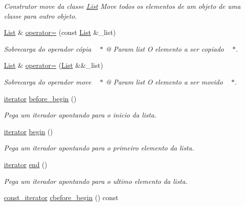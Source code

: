 \begin{DoxyCompactItemize}
\begin{DoxyCompactList}\small\item\em Construtor move da classe \hyperlink{class_list}{List} Move todos os elementos de um objeto de uma classe para outro objeto. \end{DoxyCompactList}\item 
\hyperlink{class_list}{List} \& \hyperlink{class_list_a3a2c792d937e5df5ff9977853021feee}{operator=} (const \hyperlink{class_list}{List} \&\+\_\+list)
\begin{DoxyCompactList}\small\item\em Sobrecarga do operador cópia   $\ast$ @ Param list O elemento a ser copiado   $\ast$. \end{DoxyCompactList}\item 
\hyperlink{class_list}{List} \& \hyperlink{class_list_ad9b33c07a074c6cf4551f097d11f2739}{operator=} (\hyperlink{class_list}{List} \&\&\+\_\+list)
\begin{DoxyCompactList}\small\item\em Sobrecarga do operador move   $\ast$ @ Param list O elemento a ser movido   $\ast$. \end{DoxyCompactList}\item 
\hyperlink{class_list_1_1iterator}{iterator} \hyperlink{class_list_af5325bc089d1216204eba3d7febe68fd}{before\+\_\+begin} ()
\begin{DoxyCompactList}\small\item\em Pega um iterador apontando para o inicio da lista. \end{DoxyCompactList}\item 
\hyperlink{class_list_1_1iterator}{iterator} \hyperlink{class_list_a0826516313ad1e1bd48bfbb96bee618b}{begin} ()
\begin{DoxyCompactList}\small\item\em Pega um iterador apontando para o primeiro elemento da lista. \end{DoxyCompactList}\item 
\hyperlink{class_list_1_1iterator}{iterator} \hyperlink{class_list_ab18d47922493e508f89a0cf8c82fc4a0}{end} ()
\begin{DoxyCompactList}\small\item\em Pega um iterador apontando para o ultimo elemento da lista. \end{DoxyCompactList}\item 
\hyperlink{class_list_1_1const__iterator}{const\+\_\+iterator} \hyperlink{class_list_a4d03e75dc105d2c9ed6a1aa08c6a0eac}{cbefore\+\_\+begin} () const 

\end{DoxyCompactItemize}
